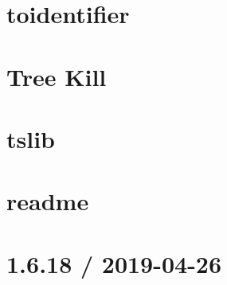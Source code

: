 \documentclass[twoside]{book}
\newcommand{\+}{\discretionary{\mbox{\scriptsize$\hookleftarrow$}}{}{}}
\begin{document}
\chapter{toidentifier}
\label{md__c___users_vaishnavi_jadhav__desktop__developer_code_mean_stack_example_client_node_modules_toidentifier__r_e_a_d_m_e}

\chapter{Tree Kill}
\label{md__c___users_vaishnavi_jadhav__desktop__developer_code_mean_stack_example_client_node_modules_tree_kill__r_e_a_d_m_e}

\chapter{tslib}
\label{md__c___users_vaishnavi_jadhav__desktop__developer_code_mean_stack_example_client_node_modules_tslib__r_e_a_d_m_e}

\chapter{readme}
\label{md__c___users_vaishnavi_jadhav__desktop__developer_code_mean_stack_example_client_node_modules_type_fest_readme}

\chapter{1.6.18 / 2019-\/04-\/26}
\label{md__c___users_vaishnavi_jadhav__desktop__developer_code_mean_stack_example_client_node_modules_type_is__h_i_s_t_o_r_y}

\end{document}
